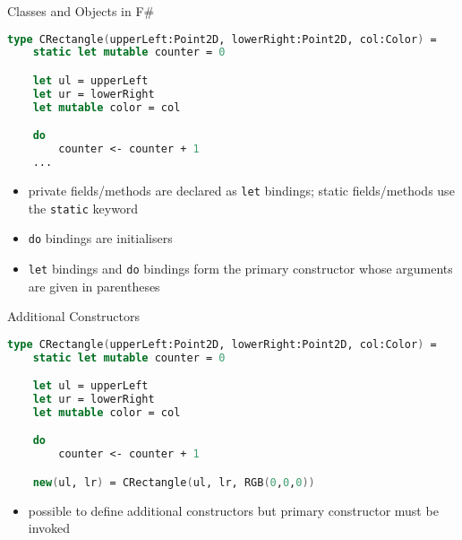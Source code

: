 \documentclass{beamer}
\begin{document}
\begin{frame}[fragile]{Classes and Objects in F\#}
\begin{lstlisting}[language=FSharp, escapechar=\%]
type CRectangle(upperLeft:Point2D, lowerRight:Point2D, col:Color) =
    static let mutable counter = 0

    let ul = upperLeft
    let ur = lowerRight
    let mutable color = col

    do
        counter <- counter + 1
    ...
\end{lstlisting}%

\begin{overlayarea}{\textwidth}{0.3\textheight}
\begin{itemize}
  \item<+-> private fields/methods are declared as \lstinline{let}
    bindings; static fields/methods use the \lstinline!static! keyword
  \item<+-> \lstinline!do! bindings are initialisers
  \item<+-> \lstinline!let! bindings and \lstinline!do! bindings form the
    primary constructor whose arguments are given in parentheses
\end{itemize}
\end{overlayarea}
\end{frame}

\begin{frame}[fragile]{Additional Constructors}
\begin{lstlisting}[language=FSharp, escapechar=\%]
type CRectangle(upperLeft:Point2D, lowerRight:Point2D, col:Color) =
    static let mutable counter = 0

    let ul = upperLeft
    let ur = lowerRight
    let mutable color = col

    do
        counter <- counter + 1

    new(ul, lr) = CRectangle(ul, lr, RGB(0,0,0))     
\end{lstlisting}

\begin{overlayarea}{\textwidth}{0.3\textheight}
\begin{itemize}
 \item<+-> possible to define additional constructors but primary
   constructor must be invoked
\end{itemize}
\end{overlayarea}
\end{frame}
\end{document}
